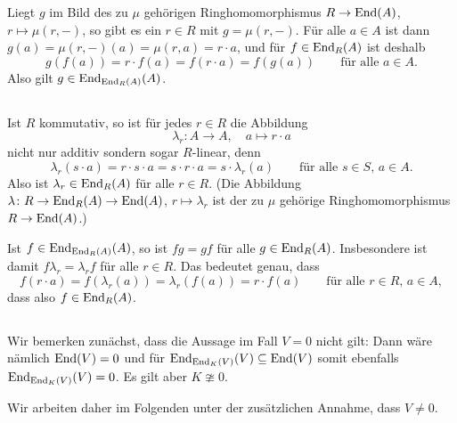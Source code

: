 \documentclass[a4paper, 10pt, numbers=noenddot]{scrartcl}
\begin{document}
Liegt $g$ im Bild des zu $\mu$ gehörigen Ringhomomorphismus $R \to \operatorname{End}(A)$, $r \mapsto \mu(r, -)$, so gibt es ein $r \in R$ mit $g = \mu(r, -)$.
Für alle $a \in A$ ist dann $g(a) = \mu(r,-)(a) = \mu(r,a) = r \cdot a$, und für $f \in \operatorname{End}_R(A)$ ist deshalb
\[
    g(f(a))
  = r \cdot f(a)
  = f(r \cdot a)
  = f(g(a))
  \qquad
  \text{für alle $a \in A$}.
\]
Also gilt $g \in \operatorname{End}_{\operatorname{End}_R(A)}(A)$.





\subsection{}

Ist $R$ kommutativ, so ist für jedes $r \in R$ die Abbildung
\[
  \lambda_r \colon A \to A,
  \quad
  a \mapsto r \cdot a
\]
nicht nur additiv sondern sogar $R$-linear, denn
\[
    \lambda_r(s \cdot a)
  = r \cdot s \cdot a
  = s \cdot r \cdot a
  = s \cdot \lambda_r(a)
  \qquad
  \text{für alle $s \in S$, $a \in A$}.
\]
Also ist $\lambda_r \in \operatorname{End}_R(A)$ für alle $r \in R$.
(Die Abbildung $\lambda \colon R \to \operatorname{End}_R(A) \to \operatorname{End}(A)$, $r \mapsto \lambda_r$ ist der zu $\mu$ gehörige Ringhomomorphismus $R \to \operatorname{End}(A)$.)

Ist $f \in \operatorname{End}_{\operatorname{End}_R(A)}(A)$, so ist $fg = gf$ für alle $g \in \operatorname{End}_R(A)$.
Insbesondere ist damit $f \lambda_r = \lambda_r f$ für alle $r \in R$.
Das bedeutet genau, dass
\[
    f(r \cdot a)
  = f(\lambda_r(a))
  = \lambda_r(f(a))
  = r \cdot f(a)
  \qquad
  \text{für alle $r \in R$, $a \in A$},
\]
dass also $f \in \operatorname{End}_R(A)$.





\subsection{}

Wir bemerken zunächst, dass die Aussage im Fall $V = 0$ nicht gilt:
Dann wäre nämlich $\operatorname{End}(V) = 0$ und für $\operatorname{End}_{\operatorname{End}_K(V)}(V) \subseteq \operatorname{End}(V)$ somit ebenfalls $\operatorname{End}_{\operatorname{End}_K(V)}(V) = 0$.
Es gilt aber $K \ncong 0$.

Wir arbeiten daher im Folgenden unter der zusätzlichen Annahme, dass $V \neq 0$.
\end{document}
